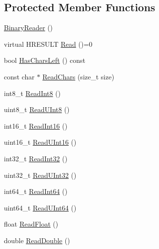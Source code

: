 \subsection*{Protected Member Functions}
\begin{DoxyCompactItemize}
\item 
\hyperlink{classmage_1_1_binary_reader_aab82579cef4f2f022273cf1adfcc8497}{Binary\+Reader} ()
\item 
virtual H\+R\+E\+S\+U\+LT \hyperlink{classmage_1_1_binary_reader_a000cf97b640a5fbd1d5c33ccaae7fb39}{Read} ()=0
\item 
bool \hyperlink{classmage_1_1_binary_reader_a35b10713dca7a416b73b28d5f6aaf600}{Has\+Chars\+Left} () const
\item 
const char $\ast$ \hyperlink{classmage_1_1_binary_reader_af1e0e4ab815e23c72ab65fd7c0748d3f}{Read\+Chars} (size\+\_\+t size)
\item 
int8\+\_\+t \hyperlink{classmage_1_1_binary_reader_abfc9296a42190b21ad0ddb6e0ea119af}{Read\+Int8} ()
\item 
uint8\+\_\+t \hyperlink{classmage_1_1_binary_reader_af0378b53d82b20ec703e09b325d7a5d2}{Read\+U\+Int8} ()
\item 
int16\+\_\+t \hyperlink{classmage_1_1_binary_reader_abb90a96c485b3acb1af3bb3bd88b76c5}{Read\+Int16} ()
\item 
uint16\+\_\+t \hyperlink{classmage_1_1_binary_reader_ad93616adef47e0256f117b8a6f8ba8bb}{Read\+U\+Int16} ()
\item 
int32\+\_\+t \hyperlink{classmage_1_1_binary_reader_a8a463e4e5469e90246a40f2898abbc67}{Read\+Int32} ()
\item 
uint32\+\_\+t \hyperlink{classmage_1_1_binary_reader_a4decb312a91e30406b82178268053f53}{Read\+U\+Int32} ()
\item 
int64\+\_\+t \hyperlink{classmage_1_1_binary_reader_a404b0bdd39f4f1cd52cb8360896ac851}{Read\+Int64} ()
\item 
uint64\+\_\+t \hyperlink{classmage_1_1_binary_reader_a480f2bd7320beed37a71b8122c8550bd}{Read\+U\+Int64} ()
\item 
float \hyperlink{classmage_1_1_binary_reader_af18ab2185b7c766c2183ab54f4676d57}{Read\+Float} ()
\item 
double \hyperlink{classmage_1_1_binary_reader_aa9d54a457a85d6f488d818c0a3e56560}{Read\+Double} ()
\end{DoxyCompactItemize}
